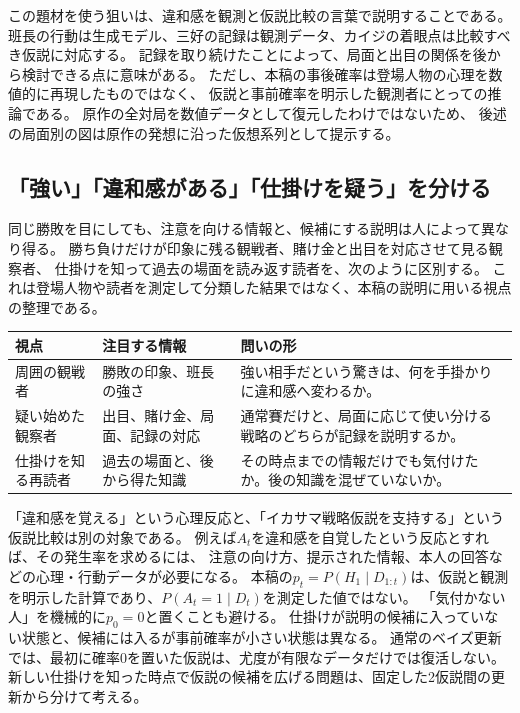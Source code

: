 \documentclass[11pt,a4paper]{article}
\numberwithin{equation}{section}
\begin{document}
この題材を使う狙いは、違和感を観測と仮説比較の言葉で説明することである。
班長の行動は生成モデル、三好の記録は観測データ、カイジの着眼点は比較すべき仮説に対応する。
記録を取り続けたことによって、局面と出目の関係を後から検討できる点に意味がある。
ただし、本稿の事後確率は登場人物の心理を数値的に再現したものではなく、
仮説と事前確率を明示した観測者にとっての推論である。
原作の全対局を数値データとして復元したわけではないため、
後述の局面別の図は原作の発想に沿った仮想系列として提示する。

\subsection{「強い」「違和感がある」「仕掛けを疑う」を分ける}
同じ勝敗を目にしても、注意を向ける情報と、候補にする説明は人によって異なり得る。
勝ち負けだけが印象に残る観戦者、賭け金と出目を対応させて見る観察者、
仕掛けを知って過去の場面を読み返す読者を、次のように区別する。
これは登場人物や読者を測定して分類した結果ではなく、本稿の説明に用いる視点の整理である。

\begin{center}
\small
\begin{tabular}{p{30mm}p{53mm}p{60mm}}
\toprule
視点 & 注目する情報 & 問いの形\\
\midrule
周囲の観戦者 & 勝敗の印象、班長の強さ & 強い相手だという驚きは、何を手掛かりに違和感へ変わるか。\\
疑い始めた観察者 & 出目、賭け金、局面、記録の対応 & 通常賽だけと、局面に応じて使い分ける戦略のどちらが記録を説明するか。\\
仕掛けを知る再読者 & 過去の場面と、後から得た知識 & その時点までの情報だけでも気付けたか。後の知識を混ぜていないか。\\
\bottomrule
\end{tabular}
\end{center}

「違和感を覚える」という心理反応と、「イカサマ戦略仮説を支持する」という仮説比較は別の対象である。
例えば$A_t$を違和感を自覚したという反応とすれば、その発生率を求めるには、
注意の向け方、提示された情報、本人の回答などの心理・行動データが必要になる。
本稿の$p_t=P(H_1\mid D_{1:t})$は、仮説と観測を明示した計算であり、$P(A_t=1\mid D_t)$を測定した値ではない。
「気付かない人」を機械的に$p_0=0$と置くことも避ける。
仕掛けが説明の候補に入っていない状態と、候補には入るが事前確率が小さい状態は異なる。
通常のベイズ更新では、最初に確率0を置いた仮説は、尤度が有限なデータだけでは復活しない。
新しい仕掛けを知った時点で仮説の候補を広げる問題は、固定した2仮説間の更新から分けて考える。
\end{document}
